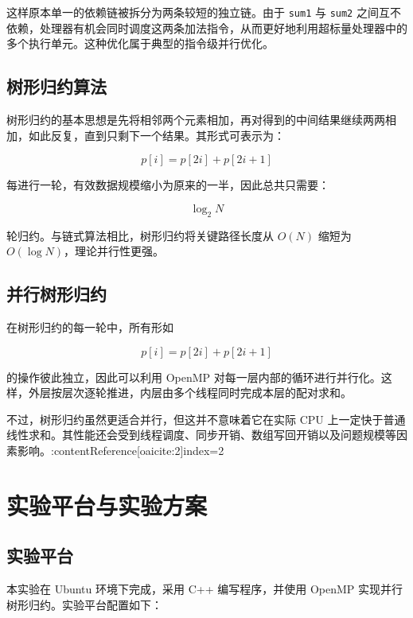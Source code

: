 \documentclass[a4paper,12pt]{ctexart}
\begin{document}
这样原本单一的依赖链被拆分为两条较短的独立链。由于 \texttt{sum1} 与 \texttt{sum2} 之间互不依赖，处理器有机会同时调度这两条加法指令，从而更好地利用超标量处理器中的多个执行单元。这种优化属于典型的指令级并行优化。

\subsection{树形归约算法}

树形归约的基本思想是先将相邻两个元素相加，再对得到的中间结果继续两两相加，如此反复，直到只剩下一个结果。其形式可表示为：

\begin{equation}
p[i]=p[2i]+p[2i+1]
\end{equation}

每进行一轮，有效数据规模缩小为原来的一半，因此总共只需要：

\begin{equation}
\log_2 N
\end{equation}

轮归约。与链式算法相比，树形归约将关键路径长度从 $O(N)$ 缩短为 $O(\log N)$，理论并行性更强。

\subsection{并行树形归约}

在树形归约的每一轮中，所有形如

\begin{equation}
p[i]=p[2i]+p[2i+1]
\end{equation}

的操作彼此独立，因此可以利用 OpenMP 对每一层内部的循环进行并行化。这样，外层按层次逐轮推进，内层由多个线程同时完成本层的配对求和。

不过，树形归约虽然更适合并行，但这并不意味着它在实际 CPU 上一定快于普通线性求和。其性能还会受到线程调度、同步开销、数组写回开销以及问题规模等因素影响。:contentReference[oaicite:2]{index=2}

\section{实验平台与实验方案}

\subsection{实验平台}

本实验在 Ubuntu 环境下完成，采用 C++ 编写程序，并使用 OpenMP 实现并行树形归约。实验平台配置如下：
\end{document}
